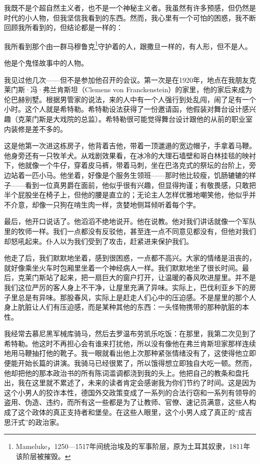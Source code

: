 \documentclass[UTF8]{ctexart}
\begin{document}
我既不是个超自然主义者，也不是一个神秘主义者。我虽然有许多预感，但仍然是时代的小人物，但我坚信我看到的东西。然而，我心里有一个可怕的困惑，我不断回顾我所看到的，但结论都是一样的：

我所看到那个由一群马穆鲁克\footnote{Mameluke，1250—1517年间统治埃及的军事阶层，原为土耳其奴隶，1811年该阶层被摧毁。}守护着的人，跟撒旦一样的，有人形，但不是人。

他是个鬼怪故事中的人物。

我见过他几次——但不是参加他召开的会议。第一次是在1920年，地点在我朋友克莱门斯·冯·弗兰肯斯坦（Clemens von Franckenstein）的家里，他的家后来成为伦巴赫别墅。根据男管家的说法，来的人中有一个人强行到处乱闯，闹了足有一个小时。这个人就是希特勒。希特勒设法获得了一份邀请函，他假装对舞台设计感兴趣（克莱门斯是大戏院的总监）。希特勒很可能觉得舞台设计跟他的从前的职业室内装修是差不多的。

这是他第一次进这栋房子，他背着吉他，带着一顶邋遢的宽边帽子，手拿着马鞭。他身旁还有一只牧羊犬。从戏剧效果看，在冰冷的大理石墙壁和哥白林挂毯的映衬下，他就像一个牛仔，穿着皮马裤，带着马刺，坐在巴洛克式的祭坛的台阶上，旁边站着一匹小马。他坐着，好像是个服务生领班——那时他比较瘦，饥肠辘辘的样子——看到一位真男爵在面前，他似乎很有兴趣，但显得拘谨；有敬畏感，只敢把半个屁股坐在椅子上，但他的腰是直立的；无论主人怎样优雅地嘲笑他，他似乎并不介意，却像一只狗在啃生肉一样，贪婪地侧耳倾听着每个字。

最后，他开口说话了。他滔滔不绝地说开。他在说教。他对我们讲话就像一个军队里的牧师一样。我们一点都没有反驳他，甚至连一点不同意见都没有，但他对我们却怒吼起来。仆人以为我们受到了攻击，赶紧进来保护我们。

他走了后，我们默默地坐着，感到很困惑，一点都不高兴。大家的情绪是沮丧的，就好像乘坐火车时包厢里坐着一个神经病人一样。我们默默地坐了很长时间。最后，克莱门斯站了起来，把一扇巨大的窗户打开，让温暖的春风吹进屋里。并不是我们这位严厉的客人身上不干净，让屋里充满了异味。实际上，巴伐利亚乡下的房子里总是有异味。那股春风，实际上是赶走人们心中的压迫感。不是屋里的那个人身上肮脏让人们有压迫感，而是某种其他的东西：一头怪物携带的那种肮脏的本性。

我经常去慕尼黑军械库骑马，然后去罗温布劳凯乐吃饭：在那里，我第二次见到了希特勒。他这时不再担心会有谁来打扰他，所以没有像他在弗兰肯斯坦家那样连续地用马鞭抽打他的靴子。我一眼就看出他上次那种紧张情绪没有了，这使得他立即便能开始长篇的讲演。我骑马已经很累了，所以饿得想立即独自大吃一顿。然而，他却把他的那本政治书的所有陈词滥调都浇到我的头上。他把自己的教条和盘托出，我在这里就不累述了，未来的读者肯定会感谢我为你们节约了时间。这是因为这个小男人的狡诈本性，德国外交政策变成了一系列的合法行窃和一系列有领导的盗用、伪造、违约，而所有这一些都是为了让教师、官僚、速记员满意，这些人构成了这个政体的真正支持者和堡垒。在这些人眼里，这个小男人成了真正的“成吉思汗式”的政治家。
\end{document}
